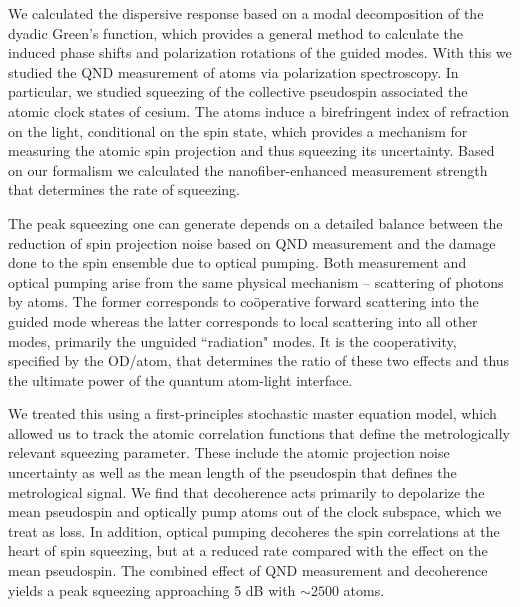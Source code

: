 \documentclass[aps,pra,twocolumn]{revtex4-1} %
\begin{document}
We calculated the dispersive response based on a modal decomposition of the dyadic Green's function, which provides a general method to calculate the induced phase shifts and polarization rotations of the guided modes. 
With this we studied the QND measurement of atoms via polarization spectroscopy. 
In particular, we studied squeezing of the collective pseudospin associated the atomic clock states of cesium. 
The atoms induce a birefringent index of refraction on the light, conditional on the spin state, which provides a mechanism for measuring the atomic spin projection and thus squeezing its uncertainty.  
Based on our formalism we calculated the nanofiber-enhanced measurement strength that determines the rate of squeezing.  

The peak squeezing one can generate depends on a detailed balance between the reduction of spin projection noise based on QND measurement and the damage done to the spin ensemble due to optical pumping.  
Both measurement and optical pumping arise from the same physical mechanism -- scattering of photons by atoms.  
The former corresponds to co\"{o}perative forward scattering into the guided mode whereas the latter corresponds to local scattering into all other modes, primarily the unguided ``radiation" modes.   
It is the cooperativity, specified by the OD/atom, that determines the ratio of these two effects and thus the ultimate power of the quantum atom-light interface. 

We treated this using a first-principles stochastic master equation model, which allowed us to track the atomic correlation functions that define the metrologically relevant squeezing parameter.  
These include the atomic projection noise uncertainty as well as the mean length of the pseudospin that defines the metrological signal.  We find that decoherence acts primarily to depolarize the mean pseudospin and optically pump atoms out of the clock subspace, which we treat as loss.  In addition, optical pumping decoheres the spin correlations at the heart of spin squeezing, but at a reduced rate compared with the effect on the mean pseudospin.  
The combined effect of QND measurement and decoherence yields a peak squeezing approaching 5 dB with $\sim 2500$ atoms. 
\end{document}
